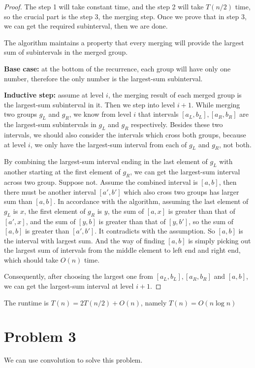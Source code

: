\documentclass[letter,12pt]{article}
\begin{document}
\begin{proof}
The step 1 will take constant time, and the step 2 will take $T(n/2)$ time,
so the crucial part is the step 3, the merging step. Once we prove that 
in step 3, we can get the required subinterval, then we are done.

The algorithm maintains a property that every merging will provide the
largest sum of subintervals in the merged group.

\textbf{Base case:} at the bottom of the recurrence, each group will have only one number, therefore the only number is the largest-sum subinterval.

\textbf{Inductive step:} assume at level $i$, the merging result of each 
merged group is the largest-sum subinterval in it. Then we step into level
$i+1$. While merging two groups $g_L$ and $g_R$, we know from level
$i$ that intervals $[a_L, b_L], [a_R,b_R]$ are the largest-sum subintervals
in $g_L$ and $g_R$ respectively. Besides these two intervals, we should 
also consider the intervals which cross both groups, because at level $i$, we only have the largest-sum interval from each of $g_L$ and $g_R$, not
both. 

By combining the largest-sum interval ending in the last element of
$g_L$ with another starting at the first element of $g_R$, we can get the 
largest-sum interval across two group. Suppose not. Assume the 
combined interval is $[a,b]$, then there must be another interval $[a',b']$ 
which also cross two groups has larger sum than $[a,b]$. In accordance 
with the algorithm, assuming the last element of $g_L$ is $x$, the first 
element of $g_R$ is $y$, the sum of $[a, x]$ is greater than that of 
$[a', x]$, and the sum of $[y, b]$ is greater than that of $[y, b']$, so 
the sum of $[a,b]$ is greater than $[a',b']$. It contradicts with the 
assumption. So $[a, b]$ is the interval with largest sum. And the way of
finding $[a,b]$ is simply picking out the largest sum of intervals from 
the middle element to left end and right end, which should take $O(n)$
time.

Consequently, after choosing the largest one from $[a_L,b_L], [a_R,b_R]$
and $[a,b]$, we can get the largest-sum interval at level $i+1$.
\end{proof}
The runtime is $T(n)=2T(n/2) + O(n)$, namely $T(n)=O(n\log n)$

\section*{Problem 3}
We can use convolution to solve this problem.
\end{document}
